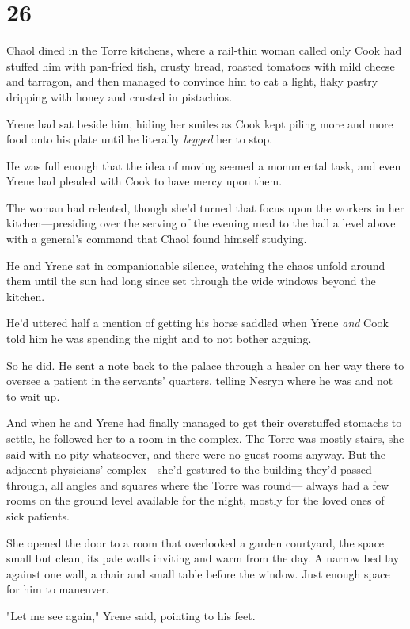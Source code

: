 
\chapter{26}

Chaol dined in the Torre kitchens, where a rail-thin woman called only Cook had stuffed him with pan-fried fish, crusty bread, roasted tomatoes with mild cheese and tarragon, and then managed to convince him to eat a light, flaky pastry dripping with honey and crusted in pistachios.

Yrene had sat beside him, hiding her smiles as Cook kept piling more and more food onto his plate until he literally \emph{begged} her to stop.

He was full enough that the idea of moving seemed a monumental task, and even Yrene had pleaded with Cook to have mercy upon them.

The woman had relented, though she'd turned that focus upon the workers in her kitchen---presiding over the serving of the evening meal to the hall a level above with a general's command that Chaol found himself studying.

He and Yrene sat in companionable silence, watching the chaos unfold around them until the sun had long since set through the wide windows beyond the kitchen.

He'd uttered half a mention of getting his horse saddled when Yrene
\emph{and} Cook told him he was spending the night and to not bother arguing.

So he did. He sent a note back to the palace through a healer on her way there to oversee a patient in the servants' quarters, telling Nesryn where he was and not to wait up.

And when he and Yrene had finally managed to get their overstuffed stomachs to settle, he followed her to a room in the complex. The Torre was mostly stairs, she said with no pity whatsoever, and there were no guest rooms anyway. But the adjacent physicians' complex---she'd gestured to the building they'd passed through, all angles and squares where the Torre was round--- always had a few rooms on the ground level available for the night, mostly for the loved ones of sick patients.

She opened the door to a room that overlooked a garden courtyard, the space small but clean, its pale walls inviting and warm from the day. A narrow bed lay against one wall, a chair and small table before the window. Just enough space for him to maneuver.

"Let me see again," Yrene said, pointing to his feet.

